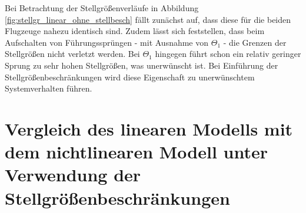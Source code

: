 Bei Betrachtung der Stellgrößenverläufe in Abbildung \ref{fig:stellgr_linear_ohne_stellbesch} fällt zunächst auf, dass diese für die beiden Flugzeuge nahezu identisch sind. Zudem lässt sich feststellen, dass beim Aufschalten von Führungssprüngen - mit Ausnahme von $\Theta_1$ - die Grenzen der Stellgrößen nicht verletzt werden. Bei $\Theta_1$ hingegen führt schon ein relativ geringer Sprung zu sehr hohen Stellgrößen, was unerwünscht ist. Bei Einführung der Stellgrößenbeschränkungen wird diese Eigenschaft zu unerwünschtem Systemverhalten führen. 

\section{Vergleich des linearen Modells mit dem nichtlinearen Modell unter Verwendung der Stellgrößenbeschränkungen}
